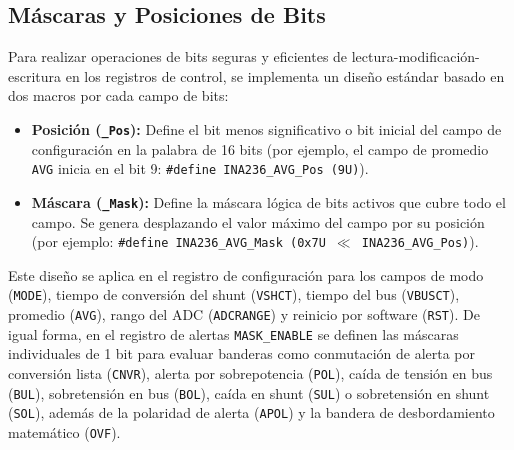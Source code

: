 \documentclass[
10pt, %
a4paper, %
oneside, %
headinclude,footinclude, %
BCOR5mm, %
]{scrartcl}
\begin{document}
\subsection{Máscaras y Posiciones de Bits}
Para realizar operaciones de bits seguras y eficientes de lectura-modificación-escritura en los registros de control, se implementa un diseño estándar basado en dos macros por cada campo de bits:
\begin{itemize}
	\item \textbf{Posición (\texttt{\_Pos}):} Define el bit menos significativo o bit inicial del campo de configuración en la palabra de 16 bits (por ejemplo, el campo de promedio \texttt{AVG} inicia en el bit 9: \texttt{\#define INA236\_AVG\_Pos (9U)}).
	\item \textbf{Máscara (\texttt{\_Mask}):} Define la máscara lógica de bits activos que cubre todo el campo. Se genera desplazando el valor máximo del campo por su posición (por ejemplo: \texttt{\#define INA236\_AVG\_Mask (0x7U $\ll$ INA236\_AVG\_Pos)}).
\end{itemize}
Este diseño se aplica en el registro de configuración para los campos de modo (\texttt{MODE}), tiempo de conversión del shunt (\texttt{VSHCT}), tiempo del bus (\texttt{VBUSCT}), promedio (\texttt{AVG}), rango del ADC (\texttt{ADCRANGE}) y reinicio por software (\texttt{RST}).
De igual forma, en el registro de alertas \texttt{MASK\_ENABLE} se definen las máscaras individuales de 1 bit para evaluar banderas como conmutación de alerta por conversión lista (\texttt{CNVR}), alerta por sobrepotencia (\texttt{POL}), caída de tensión en bus (\texttt{BUL}), sobretensión en bus (\texttt{BOL}), caída en shunt (\texttt{SUL}) o sobretensión en shunt (\texttt{SOL}), además de la polaridad de alerta (\texttt{APOL}) y la bandera de desbordamiento matemático (\texttt{OVF}).
\end{document}
